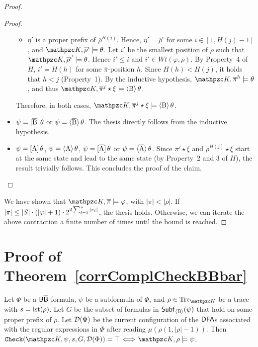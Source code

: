 \begin{proof}
\begin{proof}
\begin{itemize}
\begin{itemize}
   \item $\eta'$ is a proper prefix of $\overline{\rho}^{H(j)}$. Hence, $\eta' = \overline{\rho}^{i}$ for some $i\in [1,H(j)-1]$, and $\Ku,\overline{\rho}^{i}\models \theta $.
   Let $i'$ be the smallest position of $\overline{\rho}$ such that $\Ku,\overline{\rho}^{i'}\models\theta$. Hence $i'\leq i$ and $i'\in Wt(\varphi,\overline{\rho})$. By Property~4 of $H$, $i'=H(h)$ for some $\overline{\pi}$-position $h$. Since $H(h)<H(j)$, it holds that $h<j$ (Property~1). By the inductive hypothesis, $\Ku,\overline{\pi}^h\models \theta $, and thus $\Ku,\overline{\pi}^j\star \xi\models \hsB\theta $.
 \end{itemize}
 Therefore, in both cases, $\Ku,\overline{\pi}^j\star \xi\models \hsB\theta$.
% 
    \item $\psi=\operatorname{\mathopen[ \overline{B} \mathclose]}\theta$ or $\psi=\operatorname{\langle \overline{B}\rangle}\theta$. The thesis directly follows from the inductive hypothesis.
%
    \item $\psi = \operatorname{\mathopen[ A \mathclose]}\theta$, $\psi=\operatorname{\langle A\rangle}\theta$, $\psi = \operatorname{\mathopen[ \overline{A} \mathclose]}\theta$ or $\psi=\operatorname{\langle \overline{A}\rangle}\theta$. Since $\overline{\pi}^j\star \xi$ and $\overline{\rho}^{H(j)}\star \xi$ start at the same state and lead to the same state (by Property~2 and 3 of $H$), the result trivially follows. This concludes the proof of the claim.\qedhere
\end{itemize}
\end{proof}

We have shown that $\Ku,\overline{\pi}\models \varphi$, with $|\pi| < |\rho |$. If $|\pi|\leq |S|\cdot (|\varphi|+1)\cdot 2^{2\sum_{\ell=1}^u |r_\ell|}$, the thesis holds. Otherwise, we can iterate the above contraction a finite number of times until the bound is reached.
\end{proof}


\section{Proof of Theorem~\ref{corrComplCheckBBbar}}\label{proof:corrComplCheckBBbar}

\begin{theorem*}[\ref{corrComplCheckBBbar}]
Let $\Phi$ be a $\mathsf{B}\mathsf{\overline{B}}$ formula, $\psi$ be a subformula of $\Phi$, and $\rho\in\Trk_{\Ku}$ be a trace with $s=\operatorname{lst}(\rho)$. Let $G$ be the subset of formulas in $\mathsf{Subf}_{\operatorname{\langle B\rangle}}(\psi)$ that hold on some proper prefix of $\rho$.
Let $\mathcal{D}(\Phi)$ be the current configuration of the $\text{\sffamily DFA}$s associated with the regular expressions in $\Phi$ after reading $\mu(\rho(1,|\rho|-1))$.
%
Then $\texttt{Check}(\Ku,\psi,s,G,\Du(\Phi))=\top \!\iff\! \Ku,\rho\models \psi$.
\end{theorem*}

